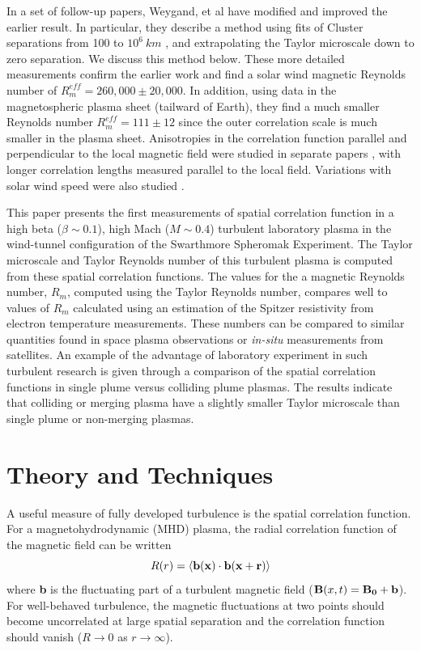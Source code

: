 \documentclass[aip,prl,amsmath,amssymb,reprint,superscriptaddress]{revtex4-1} %
\begin{document}
In a set of follow-up papers, Weygand, et al \cite{Weygand07,Weygand09,Weygand10,Weygand11} have modified and improved the earlier result.  In particular, they describe a method using fits of Cluster separations from 100 to $10^6~km$ \cite{Weygand07}, and extrapolating the Taylor microscale down to zero separation.  We discuss this method below.  These more detailed measurements confirm the earlier work  \cite{Matthaeus05} and find a solar wind magnetic Reynolds number of $R_m^{eff}  = 260,000 \pm 20,000$.  In addition, using data in the magnetospheric plasma sheet (tailward of Earth), they find a much smaller Reynolds number $R_m^{eff}  = 111 \pm 12$ since the outer correlation scale is much smaller in the plasma sheet.  Anisotropies in the correlation function parallel and perpendicular to the local magnetic field were studied in separate papers \cite{Weygand09,Weygand10}, with longer correlation lengths measured parallel to the local field.  Variations with solar wind speed were also studied \cite{Weygand11}.

This paper presents the first measurements of spatial correlation function in a high beta ($\beta \sim 0.1$), high Mach ($M \sim 0.4$) turbulent laboratory plasma in the wind-tunnel configuration of the Swarthmore Spheromak Experiment. The Taylor microscale and Taylor Reynolds number of this turbulent plasma is computed from these spatial correlation functions. The values for the a magnetic Reynolds number, $R_{m}$, computed using the Taylor Reynolds number, compares well to values of $R_{m}$ calculated using an estimation of the Spitzer resistivity from electron temperature measurements. These numbers can be compared to similar quantities found in space plasma observations or {\it in-situ} measurements from satellites. An example of the advantage of laboratory experiment in such turbulent research is given through a comparison of the spatial correlation functions in single plume versus colliding plume plasmas. The results indicate that colliding or merging plasma have a slightly smaller Taylor microscale than single plume or non-merging plasmas.

\section{Theory and Techniques}

A useful measure of fully developed turbulence is the spatial correlation function.  For a magnetohydrodynamic (MHD) plasma, the radial correlation function of the magnetic field can be written
%
\begin{equation}
R(r) =  \langle {\bf b(x) \cdot b(x + r)} \rangle
\label{eq:correlation1}
\end{equation}
%
where {\bf b} is the fluctuating part of a turbulent magnetic field (${\bf B}(x, t) = {\bf B_0 + b}$).  For well-behaved turbulence, the magnetic fluctuations at two points should become uncorrelated at large spatial separation and the correlation function should vanish ($R \rightarrow 0$ as $r \rightarrow \infty$).  
\end{document}
